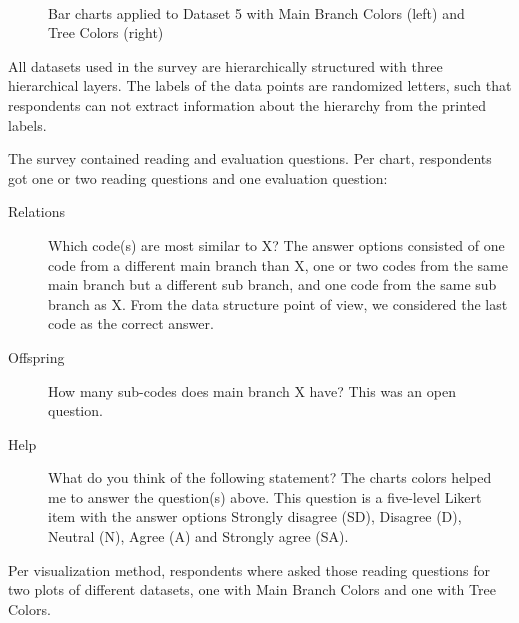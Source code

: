 \documentclass[journal]{vgtc}                %
\begin{document}
\begin{figure}[tb]
  \centering
  \mbox{
  }
  \caption{Bar charts applied to Dataset 5 with Main Branch Colors (left) and Tree Colors (right)}\label{fig:barSvy}

\end{figure}

All datasets used in the survey are hierarchically structured with three hierarchical layers. The 
labels of the data points are randomized letters, such that respondents can not extract information 
about the hierarchy from the printed labels.

The survey contained reading and evaluation questions. Per chart, respondents got one or two reading questions and one evaluation question:
\begin{description}
\item[Relations] Which code(s) are most similar to X? The answer options consisted of one code from a different main branch than X, one or two codes from the same main branch but a different sub branch, and one code from the same sub branch as X. From the data structure point of view, we considered the last code as the correct answer.
\item[Offspring] How many sub-codes does main branch X have? This was an open question.
\item[Help] What do you think of the following statement? The charts colors helped me to answer the question(s) above. This question is a five-level Likert item with the answer options Strongly disagree (SD), Disagree (D), Neutral (N), Agree (A) and Strongly agree (SA).
\end{description}
Per visualization method, respondents where asked those reading questions for two plots of different datasets, one with Main Branch Colors and one with Tree Colors. 
\end{document}
